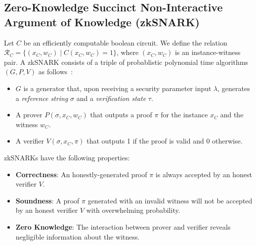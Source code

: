 \subsection{Zero-Knowledge Succinct Non-Interactive Argument of Knowledge (zkSNARK)}
Let $C$ be an efficiently computable boolean circuit.
We define the relation $\mathcal{R}_C = \{(x_C, w_C) \mid C(x_C, w_C) = 1 \}$, where $(x_C, w_C)$ is an instance-witness pair.
A zkSNARK consists of a triple of probablistic polynomial time algorithms $(G, P, V)$ as follows~\cite{snark_defn,groth_snark}:
\begin{itemize}
    \item $G$ is a generator that, upon receiving a security parameter input $\lambda$, generates a \emph{reference string} $\sigma$ and a \emph{verification state} $\tau$.
    \item A prover $P(\sigma, x_C, w_C)$ that outputs a proof $\pi$ for the instance $x_C$ and the witness $w_C$.
    \item A verifier $V(\sigma, x_C, \pi)$ that outputs 1 if the proof is valid and 0 otherwise.
\end{itemize}

zkSNARKs have the following properties:
\begin{itemize}
    \item \textbf{Correctness}: An honestly-generated proof $\pi$ is always accepted by an honest verifier $V$.
    \item \textbf{Soundness}: A proof $\pi$ generated with an invalid witness will not be accepted by an honest verifier $V$ with overwhelming probability.
    \item \textbf{Zero Knowledge}: The interaction between prover and verifier reveals negligible information about the witness.
\end{itemize}
